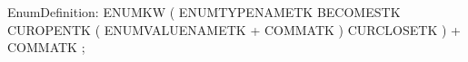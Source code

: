 %
%
%
\begin{rail}
EnumDefinition: ENUMKW ( ENUMTYPENAMETK BECOMESTK
                CUROPENTK ( ENUMVALUENAMETK + COMMATK ) CURCLOSETK ) + COMMATK ;
\end{rail}
